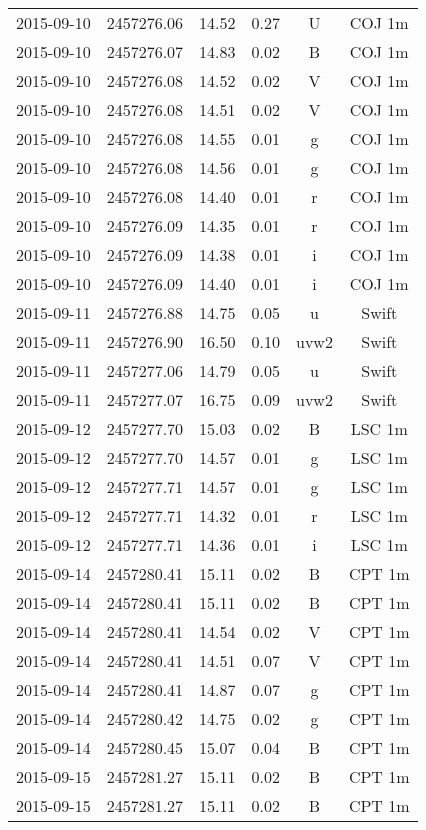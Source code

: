 \begin{table}
\begin{tabular}{cccccc}
2015-09-10 & 2457276.06 & 14.52 & 0.27 & U & COJ 1m \\
2015-09-10 & 2457276.07 & 14.83 & 0.02 & B & COJ 1m \\
2015-09-10 & 2457276.08 & 14.52 & 0.02 & V & COJ 1m \\
2015-09-10 & 2457276.08 & 14.51 & 0.02 & V & COJ 1m \\
2015-09-10 & 2457276.08 & 14.55 & 0.01 & g & COJ 1m \\
2015-09-10 & 2457276.08 & 14.56 & 0.01 & g & COJ 1m \\
2015-09-10 & 2457276.08 & 14.40 & 0.01 & r & COJ 1m \\
2015-09-10 & 2457276.09 & 14.35 & 0.01 & r & COJ 1m \\
2015-09-10 & 2457276.09 & 14.38 & 0.01 & i & COJ 1m \\
2015-09-10 & 2457276.09 & 14.40 & 0.01 & i & COJ 1m \\
2015-09-11 & 2457276.88 & 14.75 & 0.05 & u & Swift \\
2015-09-11 & 2457276.90 & 16.50 & 0.10 & uvw2 & Swift \\
2015-09-11 & 2457277.06 & 14.79 & 0.05 & u & Swift \\
2015-09-11 & 2457277.07 & 16.75 & 0.09 & uvw2 & Swift \\
2015-09-12 & 2457277.70 & 15.03 & 0.02 & B & LSC 1m \\
2015-09-12 & 2457277.70 & 14.57 & 0.01 & g & LSC 1m \\
2015-09-12 & 2457277.71 & 14.57 & 0.01 & g & LSC 1m \\
2015-09-12 & 2457277.71 & 14.32 & 0.01 & r & LSC 1m \\
2015-09-12 & 2457277.71 & 14.36 & 0.01 & i & LSC 1m \\
2015-09-14 & 2457280.41 & 15.11 & 0.02 & B & CPT 1m \\
2015-09-14 & 2457280.41 & 15.11 & 0.02 & B & CPT 1m \\
2015-09-14 & 2457280.41 & 14.54 & 0.02 & V & CPT 1m \\
2015-09-14 & 2457280.41 & 14.51 & 0.07 & V & CPT 1m \\
2015-09-14 & 2457280.41 & 14.87 & 0.07 & g & CPT 1m \\
2015-09-14 & 2457280.42 & 14.75 & 0.02 & g & CPT 1m \\
2015-09-14 & 2457280.45 & 15.07 & 0.04 & B & CPT 1m \\
2015-09-15 & 2457281.27 & 15.11 & 0.02 & B & CPT 1m \\
2015-09-15 & 2457281.27 & 15.11 & 0.02 & B & CPT 1m \\

\end{tabular}
\end{table}
